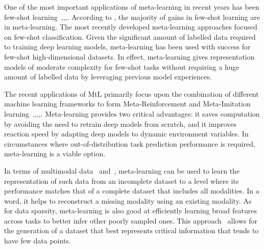 \documentclass{article}
\begin{document}
One of the most important applications of meta-learning in recent years has been few-shot learning~\cite{vinyalsMatchingNetworksOne2017},\cite{snellPrototypicalNetworksFewshot2017},\cite{gordonVersaVersatileEfficient2018},\cite{wangGeneralizingFewExamples2020}. According to \textcite{wangGeneralizingFewExamples2020}, the majority of gains in few-shot learning are in meta-learning. The most recently developed meta-learning approaches focused on few-shot classification. Given the significant amount of labelled data required to training deep learning models, meta-learning has been used with success for few-shot high-dimensional datasets. In effect, meta-learning gives representation models of moderate complexity for few-shot tasks without requiring a huge amount of labelled data by leveraging previous model experiences. %

The recent applications of MtL primarily focus upon the combination of different machine learning frameworks to form Meta-Reinforcement and Meta-Imitation learning~\cite{jaafraReviewMetaReinforcementLearning2018},\cite{humplikMetaReinforcementLearning2019},\cite{dasguptaCausalReasoningMetareinforcement2019},\cite{nathanielMetaFluxMetalearningGlobal2023},\cite{duanOneShotImitationLearning2017}. 
Meta-learning provides two critical advantages: it saves computation by avoiding the need to retrain deep models from scratch, and it improves reaction speed by adapting deep models to dynamic environment variables. In circumstances where out-of-distribution task prediction performance is required, meta-learning is a viable option. %

In terms of multimodal data~\cite{agrawalMetalearningBasedGenerative2023} and~\cite{leiInnovativeApproachBased2023}, meta-learning can be used to learn the representation of such data from an incomplete dataset to a level where its performance matches that of a complete dataset that includes all modalities. In a word, it helps to reconstruct a missing modality using an existing modality. As for data sparsity, meta-learning is also good at efficiently learning broad features across tasks to better infer other poorly sampled ones. This approach~\cite{nathanielMetaFluxMetalearningGlobal2023} allows for the generation of a dataset that best represents critical information that tends to have few data points.
\end{document}
